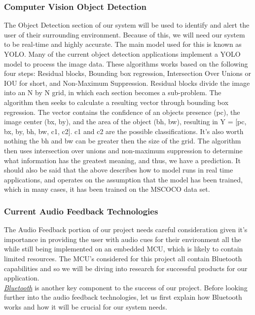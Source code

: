 \subsubsection{Computer Vision Object Detection}
\noindent The Object Detection section of our system will be used to identify and alert the user of their surrounding environment. Because of this, we will need our system to be real-time and highly accurate. The main model used for this is known as YOLO. Many of the current object detection applications implement a YOLO model to process the image data. These algorithms works based on the following four steps: Residual blocks, Bounding box regression, Intersection Over Unions or IOU for short, and Non-Maximum Suppression. Residual blocks divide the image into an N by N grid, in which each section becomes a sub-problem. The algorithm then seeks to calculate a resulting vector through bounding box regression. The vector contains the confidence of an objects presence (pc), the image center (bx, by), and the area of the object (bh, bw), resulting in Y = [pc, bx, by, bh, bw, c1, c2]. c1 and c2 are the possible classifications. It's also worth nothing the bh and bw can be greater then the size of the grid. The algorithm then uses intersection over unions and non-maximum suppression to determine what information has the greatest meaning, and thus, we have a prediction. It should also be said that the above describes how to model runs in real time applications, and operates on the assumption that the model has been trained, which in many cases, it has been trained on the MSCOCO data set. \\

\subsubsection{Current Audio Feedback Technologies}
\noindent The Audio Feedback portion of our project needs careful consideration given it's importance in providing the user with audio cues for their environment all the while still being implemented on an embedded MCU, which is likely to contain limited resources. The MCU's considered for this project all contain Bluetooth capabilities and so we will be diving into research for successful products for our application. \\

\noindent \underline{\textit{Bluetooth}} \cite{bluetooth} is another key component to the success of our project. Before looking further into the audio feedback technologies, let us first explain how Bluetooth works and how it will be crucial for our system needs. \\

